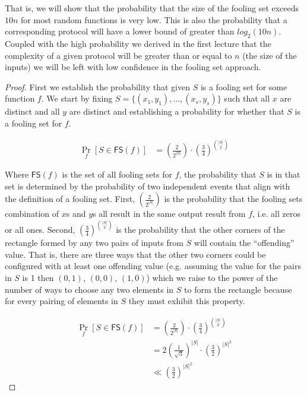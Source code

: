 \documentclass[usletter]{article}
\begin{document}
That is, we will show that the probability that the size of the fooling set exceeds $10n$ for most random functions is very low. This is also the probability that a corresponding protocol will have a lower bound of greater than $log_2(10n)$. Coupled with the high probability we derived in the first lecture that the complexity of a given protocol will be greater than or equal to $n$ (the size of the inputs) we will be left with low confidence in the fooling set approach.

\begin{proof}
  First we establish the probability that given $S$ is a fooling set for some function $f$. We start by fixing $S = \{(x_1, y_1), \ldots, (x_s, y_s)\}$ such that all $x$ are distinct and all $y$ are distinct and establishing a probability for whether that $S$ is a fooling set for $f$.

\begin{align*}
\Pr_f\left[  S \in \mathsf{FS}(f) \right] &=
  \left( \frac{2}{2^{|S|}} \right) \cdot \left( \frac{3}{4} \right)^{{|S| \choose 2}}
\end{align*}

Where $\mathsf{FS}(f)$ is the set of all fooling sets for $f$, the probability that $S$ is in that set is determined by the probability of two independent events that align with the definition of a fooling set. First, $\left( \frac{2}{2^{|S|}} \right)$ is the probability that the fooling sets combination of $x$s and $y$s all result in the same output result from $f$, i.e. all zeros or all ones. Second, $\left( \frac{3}{4} \right)^{{|S| \choose 2}}$ is the probability that the other corners of the rectangle formed by any two pairs of inputs from $S$ will contain the ``offending'' value. That is, there are three ways that the other two corners could be configured with at least one offending value (e.g. assuming the value for the pairs in $S$ is 1 then $(0,1)$, $(0,0)$, $(1,0)$) which we raise to the power of the number of ways to choose any two elements in $S$ to form the rectangle because for every pairing of elements in $S$ they must exhibit this property.

\begin{align*}
\Pr_f\left[  S \in \mathsf{FS}(f) \right]
  &= \left( \frac{2}{2^{|S|}} \right) \cdot \left( \frac{3}{4} \right)^{{|S| \choose 2}} \\
  &= 2 \left( \frac{1}{\sqrt{3}} \right)^{|S|} \cdot \left( \frac{3}{2} \right)^{|S|^2} \\
  &\ll \left( \frac{3}{2} \right)^{|S|^2}
\end{align*}


\end{proof}
\end{document}
